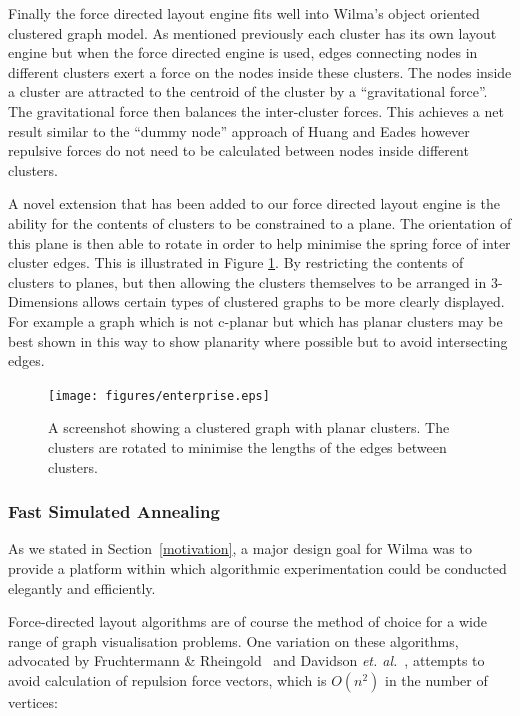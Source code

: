 \documentclass[runningheads]{cl2emult}
\begin{document}
Finally the force directed layout engine fits well into Wilma's object
oriented clustered graph model.  As mentioned previously each cluster
has its own layout engine but when the force directed engine is used,
edges connecting nodes in different clusters exert a force on
the nodes inside these clusters.  The nodes inside a cluster are
attracted to the centroid of the cluster by a ``gravitational force''.
The gravitational force then balances the inter-cluster forces.  This
achieves a net result similar to the ``dummy node'' approach of Huang
and Eades\cite{Huang:GD98} however repulsive forces do not need to be
calculated between nodes inside different clusters.

A novel extension that has been added to our force directed layout
engine is the ability for the contents of clusters to be constrained
to a plane.  The orientation of this plane is then able to rotate in
order to help minimise the spring force of inter cluster edges.  This
is illustrated in Figure \ref{fig-spincluster}.  By restricting the
contents of clusters to planes, but then allowing the clusters
themselves to be arranged in 3-Dimensions allows certain types of
clustered
graphs to be more clearly displayed.  For example a graph which is not
c-planar\cite{Eades:GD96} but which has planar clusters may be best
shown in this way to show planarity where possible but to avoid
intersecting edges.
\begin{figure}[h]
  \centering
    \texttt{[image: figures/enterprise.eps]}
  \caption{A screenshot showing a clustered graph with planar
  clusters.  The clusters are rotated to minimise the lengths of the
  edges between clusters.}
  \label{fig-spincluster}
\end{figure}

\subsubsection{Fast Simulated Annealing}

As we stated in Section~\ref{motivation}, a major design goal for Wilma
was to provide a platform within which algorithmic experimentation could be
conducted elegantly and efficiently.

Force-directed layout algorithms are of course the method of choice for a
wide range of graph visualisation problems.  One variation on these
algorithms, advocated by Fruchtermann \&
Rheingold~\cite{fruchtermann90force-directed} and Davidson {\em et.
al.}~\cite{davidson01noise}, attempts to avoid calculation of repulsion force
vectors, which is $O(n^2)$ in the number of vertices:  
\end{document}
